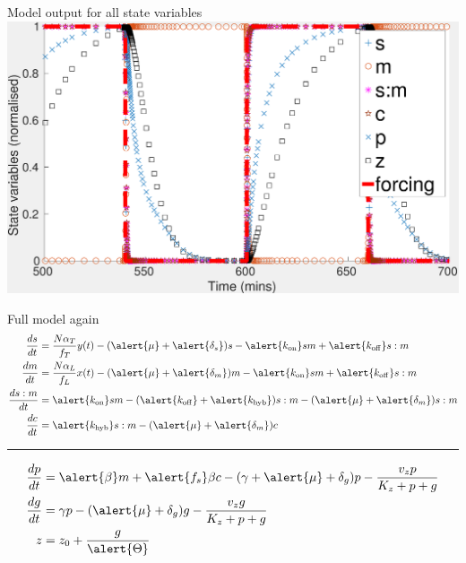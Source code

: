 \documentclass{beamer}
\begin{document}
\begin{frame}{Model output for all state variables}
  \includegraphics[scale = 0.29, clip = true, trim = 0 0 0 0]{Figures/model_output}
\end{frame}

\small
\begin{frame}{Full model again}
\begin{align*} 
\frac{ds}{dt} &= \frac{N\alpha_{T}}{f_{T}} y(t)-(\alert{\mu} + \alert{\delta_{s}})s -\alert{k_{\mathrm{on}}}sm +\alert{k_{\mathrm{off}}}s:m \\
\frac{dm}{dt} &=  \frac{N\alpha_{L}}{f_{L}}x(t)-(\alert{\mu} + \alert{\delta_{m}})m -\alert{k_{\mathrm{on}}}sm +\alert{k_{\mathrm{off}}}s:m  \\
\frac{ds:m}{dt} & = \alert{k_{\mathrm{on}}}sm  - (\alert{k_{\mathrm{off}}}+ \alert{k_{\mathrm{hyb}}})s:m  -(\alert{\mu} + \alert{\delta_{m}} )s:m \\
\frac{dc}{dt} & = \alert{k_{\mathrm{hyb}}}s:m  -(\alert{\mu} + \alert{\delta_{m}})c  
\end{align*}
\begin{center}
\rule{0.5\textwidth}{.4pt}
\end{center}
\begin{align*} 
\frac{dp}{dt} & = \alert{\beta} m +\alert{f_{s}}\beta c -(\gamma + \alert{\mu} + \delta_{g})p - \frac{v_{z}p}{K_{z}+p+g}   \\
\frac{dg}{dt} & = \gamma p - (\alert{\mu} + \delta_{g})g - \frac{v_{z}g}{K_{z}+p+g} \\
z &= z_{0} +\frac{g}{\alert{\Theta}} 
\end{align*}
\end{frame}
\normalsize
\end{document}
